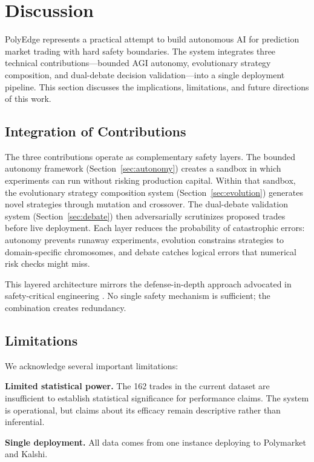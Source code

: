 \section{Discussion}\label{sec:discussion}

PolyEdge represents a practical attempt to build autonomous AI for prediction market trading with hard safety boundaries. The system integrates three technical contributions---bounded AGI autonomy, evolutionary strategy composition, and dual-debate decision validation---into a single deployment pipeline. This section discusses the implications, limitations, and future directions of this work.

\subsection{Integration of Contributions}

The three contributions operate as complementary safety layers. The bounded autonomy framework (Section~\ref{sec:autonomy}) creates a sandbox in which experiments can run without risking production capital. Within that sandbox, the evolutionary strategy composition system (Section~\ref{sec:evolution}) generates novel strategies through mutation and crossover. The dual-debate validation system (Section~\ref{sec:debate}) then adversarially scrutinizes proposed trades before live deployment. Each layer reduces the probability of catastrophic errors: autonomy prevents runaway experiments, evolution constrains strategies to domain-specific chromosomes, and debate catches logical errors that numerical risk checks might miss.

This layered architecture mirrors the defense-in-depth approach advocated in safety-critical engineering \citep{nygard2018release}. No single safety mechanism is sufficient; the combination creates redundancy.

\subsection{Limitations}

We acknowledge several important limitations:

\textbf{Limited statistical power.} The 162 trades in the current dataset are insufficient to establish statistical significance for performance claims. The system is operational, but claims about its efficacy remain descriptive rather than inferential.

\textbf{Single deployment.} All data comes from one instance deploying to Polymarket and Kalshi.

